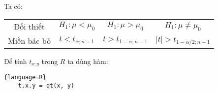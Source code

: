 Ta có:

\begin{center}
    \begin{tabular}{| c | c | c | c |}
        \hline
        Đối thiết & $H_1: \mu < \mu_0$ & $H_1: \mu > \mu_0$ & $H_1: \mu \neq \mu_0$ \\
        Miền bác bỏ & $t < t_{\alpha; n - 1}$ & $t > t_{1-\alpha; n - 1}$ & $\lvert t \rvert > t_{1 - \alpha / 2; n - 1}$ \\
        \hline
    \end{tabular}
\end{center}

Để tính $t_{x; y}$ trong $R$ ta dùng hàm:

\begin{lstlisting}{language=R}
    t.x.y = qt(x, y)
\end{lstlisting}


